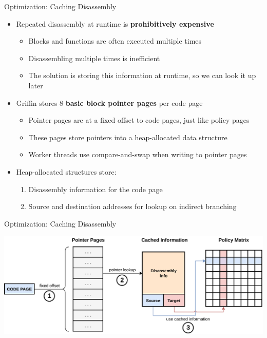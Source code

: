 \documentclass[12pt, dvipsnames, aspectratio=169]{beamer}
\begin{document}
\begin{frame}[c]{Optimization: Caching Disassembly}{}
  \begin{itemize}
    \item Repeated disassembly at runtime is {\bf prohibitively expensive}
    \begin{itemize}
      \item Blocks and functions are often executed multiple times
      \item Disassembling multiple times is inefficient
      \item The solution is storing this information at runtime, so we can look it up later
    \end{itemize}

    \vfill
    \item Griffin stores 8 {\bf basic block pointer pages} per code page
    \begin{itemize}
      \item Pointer pages are at a fixed offset to code pages, just like policy pages
      \item These pages store pointers into a heap-allocated data structure
      \item Worker threads use compare-and-swap when writing to pointer pages
    \end{itemize}

    \vfill
    \item Heap-allocated structures store:
    \begin{enumerate}
      \item Disassembly information for the code page
      \item Source and destination addresses for lookup on indirect branching
    \end{enumerate}
  \end{itemize}
\end{frame}

\begin{frame}[c]{Optimization: Caching Disassembly}{}
  \begin{center}
    \color{black}
    \includegraphics[width=1\columnwidth]{figs/matrix.pdf}
  \end{center}
\end{frame}
\end{document}
